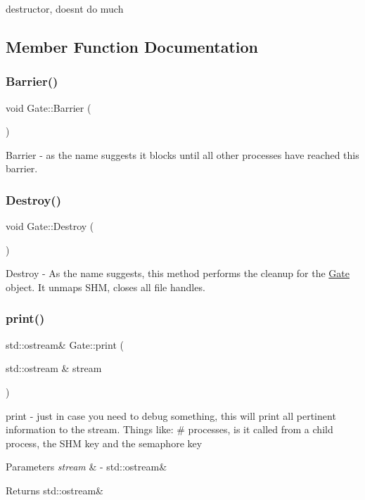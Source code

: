 destructor, doesn\textquotesingle{}t do much 

\subsection{Member Function Documentation}
\hypertarget{class_gate_a39d25cf4111e160bd552aa71b808fc2d}{}\label{class_gate_a39d25cf4111e160bd552aa71b808fc2d} 
\subsubsection{\texorpdfstring{Barrier()}{Barrier()}}
{\footnotesize\ttfamily void Gate\+::\+Barrier (\begin{DoxyParamCaption}{ }\end{DoxyParamCaption})}

Barrier -\/ as the name suggests it blocks until all other processes have reached this barrier. \hypertarget{class_gate_a760a4286d19c8999a3b28157f89d1c4b}{}\label{class_gate_a760a4286d19c8999a3b28157f89d1c4b} 
\subsubsection{\texorpdfstring{Destroy()}{Destroy()}}
{\footnotesize\ttfamily void Gate\+::\+Destroy (\begin{DoxyParamCaption}{ }\end{DoxyParamCaption})}

Destroy -\/ As the name suggests, this method performs the cleanup for the \hyperlink{class_gate}{Gate} object. It unmaps S\+HM, closes all file handles. \hypertarget{class_gate_a3306a9171e6adaa6907973ef8fe274de}{}\label{class_gate_a3306a9171e6adaa6907973ef8fe274de} 
\subsubsection{\texorpdfstring{print()}{print()}}
{\footnotesize\ttfamily std\+::ostream\& Gate\+::print (\begin{DoxyParamCaption}\item[{std\+::ostream \&}]{stream }\end{DoxyParamCaption})}

print -\/ just in case you need to debug something, this will print all pertinent information to the stream. Things like\+: \# processes, is it called from a child process, the S\+HM key and the semaphore key 
\begin{DoxyParams}{Parameters}
{\em stream} & -\/ std\+::ostream\& \\
\hline
\end{DoxyParams}
\begin{DoxyReturn}{Returns}
std\+::ostream\& 
\end{DoxyReturn}
\hypertarget{class_gate_ac1fa1904a541351a562e4d0951a0e4c2}{}\label{class_gate_ac1fa1904a541351a562e4d0951a0e4c2} 
